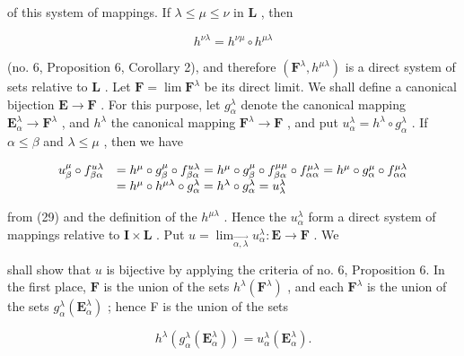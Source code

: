 of this system of mappings. If \(\lambda \leqslant \mu \leqslant \nu\) in \(\mathbf{L}\) , then

\[
h ^ {\nu \lambda} = h ^ {\nu \mu} \circ h ^ {\mu \lambda}\tag{31}
\]

(no. 6, Proposition 6, Corollary 2), and therefore \((\mathbf{F}^{\lambda}, h^{\mu \lambda})\) is a direct system of sets relative to \(\mathbf{L}\) . Let \(\mathbf{F} = \lim \mathbf{F}^{\lambda}\) be its direct limit. We shall define a canonical bijection \(\mathbf{E} \to \mathbf{F}\) . For this purpose, let \(g_{\alpha}^{\lambda}\) denote the canonical mapping \(\mathbf{E}_{\alpha}^{\lambda} \to \mathbf{F}^{\lambda}\) , and \(h^{\lambda}\) the canonical mapping \(\mathbf{F}^{\lambda} \to \mathbf{F}\) , and put \(u_{\alpha}^{\lambda} = h^{\lambda} \circ g_{\alpha}^{\lambda}\) . If \(\alpha \leqslant \beta\) and \(\lambda \leqslant \mu\) , then we have

\[
\begin{array}{r l} u _ {\beta} ^ {\mu} \circ f _ {\beta \alpha} ^ {u \lambda} & = h ^ {\mu} \circ g _ {\beta} ^ {\mu} \circ f _ {\beta \alpha} ^ {u \lambda} = h ^ {\mu} \circ g _ {\beta} ^ {\mu} \circ f _ {\beta \alpha} ^ {\mu \mu} \circ f _ {\alpha \alpha} ^ {\mu \lambda} = h ^ {\mu} \circ g _ {\alpha} ^ {\mu} \circ f _ {\alpha \alpha} ^ {\mu \lambda} \\ & = h ^ {\mu} \circ h ^ {\mu \lambda} \circ g _ {\alpha} ^ {\lambda} = h ^ {\lambda} \circ g _ {\alpha} ^ {\lambda} = u _ {\lambda} ^ {\lambda} \end{array}
\]

from (29) and the definition of the \(h^{\mu \lambda}\) . Hence the \(u_{\alpha}^{\lambda}\) form a direct system of mappings relative to \(\mathbf{I} \times \mathbf{L}\) . Put \(u = \lim_{\overrightarrow{\alpha, \lambda}} u_{\alpha}^{\lambda}: \mathbf{E} \to \mathbf{F}\) . We

shall show that \(u\) is bijective by applying the criteria of no. 6, Proposition 6. In the first place, \(\mathbf{F}\) is the union of the sets \(h^{\lambda}(\mathbf{F}^{\lambda})\) , and each \(\mathbf{F}^{\lambda}\) is the union of the sets \(g_{\alpha}^{\lambda}(\mathbf{E}_{\alpha}^{\lambda})\) ; hence F is the union of the sets

\[
h ^ {\lambda} (g _ {\alpha} ^ {\lambda} (\mathbf {E} _ {\alpha} ^ {\lambda})) = u _ {\alpha} ^ {\lambda} (\mathbf {E} _ {\alpha} ^ {\lambda}).
\]

